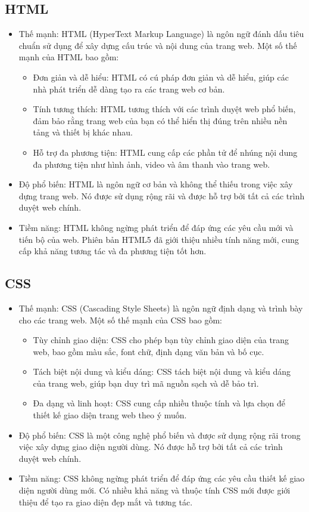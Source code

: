 \documentclass[../Thesis.tex]{subfiles}
\begin{document}
		\subsection{HTML}
			\begin{itemize}
				\item Thế mạnh: HTML (HyperText Markup Language) là ngôn ngữ đánh dấu tiêu chuẩn sử dụng để xây dựng cấu trúc và nội dung của trang web. Một số thế mạnh của HTML bao gồm:
				\begin{itemize}
					\item Đơn giản và dễ hiểu: HTML có cú pháp đơn giản và dễ hiểu, giúp các nhà phát triển dễ dàng tạo ra các trang web cơ bản.
					\item Tính tương thích: HTML tương thích với các trình duyệt web phổ biến, đảm bảo rằng trang web của bạn có thể hiển thị đúng trên nhiều nền tảng và thiết bị khác nhau.
					\item Hỗ trợ đa phương tiện: HTML cung cấp các phần tử để nhúng nội dung đa phương tiện như hình ảnh, video và âm thanh vào trang web.
				\end{itemize}
				\item Độ phổ biến: HTML là ngôn ngữ cơ bản và không thể thiếu trong việc xây dựng trang web. Nó được sử dụng rộng rãi và được hỗ trợ bởi tất cả các trình duyệt web chính.
				\item Tiềm năng: HTML không ngừng phát triển để đáp ứng các yêu cầu mới và tiến bộ của web. Phiên bản HTML5 đã giới thiệu nhiều tính năng mới, cung cấp khả năng tương tác và đa phương tiện tốt hơn.
			\end{itemize}

		\subsection{CSS}
			\begin{itemize}
				\item Thế mạnh: CSS (Cascading Style Sheets) là ngôn ngữ định dạng và trình bày cho các trang web. Một số thế mạnh của CSS bao gồm:
				\begin{itemize}
					\item Tùy chỉnh giao diện: CSS cho phép bạn tùy chỉnh giao diện của trang web, bao gồm màu sắc, font chữ, định dạng văn bản và bố cục.
					\item Tách biệt nội dung và kiểu dáng: CSS tách biệt nội dung và kiểu dáng của trang web, giúp bạn duy trì mã nguồn sạch và dễ bảo trì.
					\item Đa dạng và linh hoạt: CSS cung cấp nhiều thuộc tính và lựa chọn để thiết kế giao diện trang web theo ý muốn.
				\end{itemize}
				\item Độ phổ biến: CSS là một công nghệ phổ biến và được sử dụng rộng rãi trong việc xây dựng giao diện người dùng. Nó được hỗ trợ bởi tất cả các trình duyệt web chính.

				\item Tiềm năng: CSS không ngừng phát triển để đáp ứng các yêu cầu thiết kế giao diện người dùng mới. Có nhiều khả năng và thuộc tính CSS mới được giới thiệu để tạo ra giao diện đẹp mắt và tương tác.
			\end{itemize}
\end{document}
